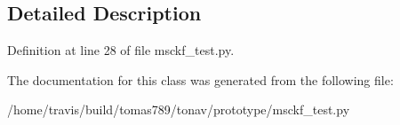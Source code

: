 \subsection{Detailed Description}


Definition at line 28 of file msckf\-\_\-test.\-py.



The documentation for this class was generated from the following file\-:\begin{DoxyCompactItemize}
\item 
/home/travis/build/tomas789/tonav/prototype/msckf\-\_\-test.\-py\end{DoxyCompactItemize}
